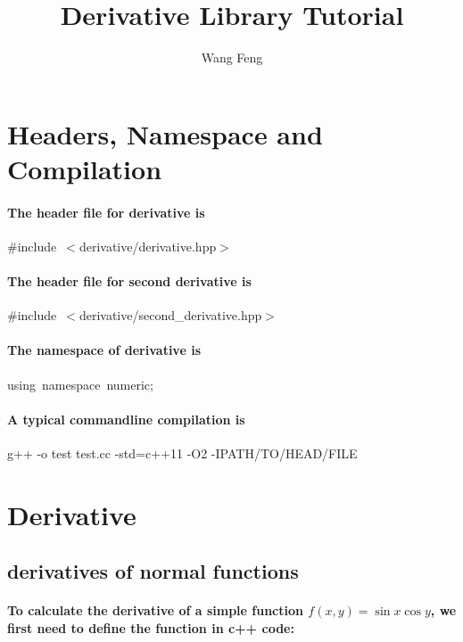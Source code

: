 \documentclass[9pt,onside]{article}
\author{Wang Feng}
\title{Derivative Library Tutorial}
\newcommand{\hlstd}[1]{\textcolor[rgb]{0.2,0,0.4}{#1}}
\newcommand{\hlppc}[1]{\textcolor[rgb]{0.33,0.45,0.69}{#1}}
\newcommand{\hlopt}[1]{\textcolor[rgb]{0.33,0.33,0.33}{#1}}
\newcommand{\hlkwa}[1]{\textcolor[rgb]{1,0.19,0.19}{#1}}
\newcommand{\hlred}[1]{\textcolor[rgb]{1.0,0.0,0.0}{#1}}
\begin{document}
\maketitle
{}

\section{Headers, Namespace and Compilation}

\paragraph{The header file for derivative is\\}
\hlstd{}\hlppc{\#include\ $<$derivative/derivative.hpp$>$}

\paragraph{The header file for second derivative is\\}
\hlstd{}\hlppc{\#include\ $<$derivative/second\_derivative.hpp$>$}

\paragraph{The namespace of derivative is\\}
\hlstd{}\hlkwa{using\ namespace\ }{numeric}\hlopt{;}\hspace*{\fill} 

\paragraph{A typical commandline compilation is\\}
\hlstd{}g++ -o test test.cc -std=c++11 -O2 -I\hlred{PATH/TO/HEAD/FILE}

\section{Derivative}

\subsection{derivatives of normal functions}

\paragraph{To calculate the derivative of a simple function $ f(x,y) = \sin x \cos y $, we first need to define the function in c++ code:}
\end{document}
